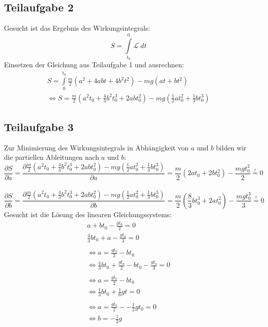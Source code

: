 \documentclass[a4paper,german,12pt,smallheadings]{scrartcl}
\begin{document}
\subsection*{Teilaufgabe 2}
Gesucht ist das Ergebnis des Wirkungsintegrals:
\begin{equation}
S=\int\limits_{t_0}^{0} \mathcal{L} \; dt
\end{equation}
Einsetzen der Gleichung aus Teilaufgabe 1 und ausrechnen:
\begin{align*}
S=\int\limits_{0}^{t_0} \frac{m}{2} \left(a^2+4abt+4b^2t^2\right) - mg\left(at+bt^2\right)\\
\Leftrightarrow S=\frac{m}{2} \left(a^2t_0+\frac{4}{3}b^2t_0^3+2abt_0^2\right)-mg\left(\frac{1}{2} at_0^2+ \frac{1}{3} bt_0^3\right)
\end{align*}
\subsection*{Teilaufgabe 3}
Zur Minimierung des Wirkungsintegrals in Abhängigkeit von $a$ und $b$ bilden wir die partiellen Ableitungen nach $a$ und $b$:
\begin{equation}
\frac{\partial S}{\partial a}=\frac{\partial \frac{m}{2} \left(a^2t_0+\frac{4}{3}b^2t_0^3+2abt_0^2\right)-mg\left(\frac{1}{2} at_0^2+ \frac{1}{3} bt_0^3\right)}{\partial a}=\frac{m}{2}\left(2at_0+2bt_0^2\right)-\frac{mgt_0^2}{2}\overset{!}{=}0
\end{equation}
\\
\begin{equation}
\frac{\partial S}{\partial b}=\frac{\partial \frac{m}{2} \left(a^2t_0+\frac{4}{3}b^2t_0^3+2abt_0^2\right)-mg\left(\frac{1}{2} at_0^2+ \frac{1}{3} bt_0^3\right)}{\partial b}=\frac{m}{2}\left(\frac{8}{3}bt_0^3+2at_0^2\right)-\frac{mgt_0^3}{3}\overset{!}{=}0
\end{equation}
Gesucht ist die Lösung des linearen Gleichungssystems:
\begin{align*}
a+bt_0-\frac{gt_0}{2}=0\\
\frac{4}{3}bt_0+a-\frac{gt_0}{3}=0\\
\\
\Leftrightarrow a=\frac{gt_0}{2}-bt_0\\
\Leftrightarrow \frac{4}{3}bt_0+\frac{gt_0}{2}-bt_0-\frac{gt_0}{3}=0\\
\\
\Leftrightarrow a=\frac{gt_0}{2}-bt_0\\
\Leftrightarrow \frac{1}{3}bt_0+\frac{1}{6}gt=0\\
\\
\Leftrightarrow a=\frac{gt_0}{2}--\frac{1}{2}gt_0=0\\
\Leftrightarrow b=-\frac{1}{2}g\\
\\
\end{align*}
\end{document}
